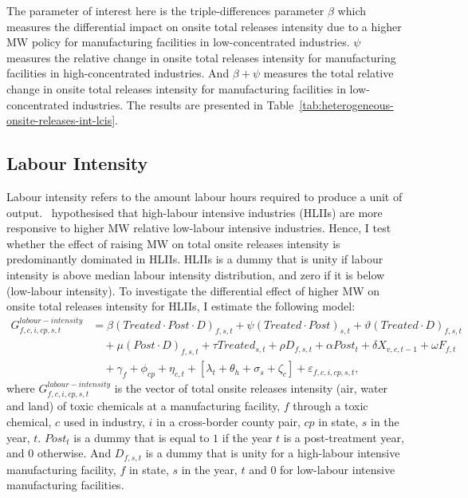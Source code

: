 \documentclass[12pt, english]{article}
\begin{document}
    The parameter of interest here is the triple-differences parameter $\beta$ which measures the differential impact on onsite total releases intensity due to a higher MW policy for manufacturing facilities in low-concentrated industries. $\psi$ measures the relative change in onsite total releases intensity for manufacturing facilities in high-concentrated industries. And $\beta + \psi$ measures the total relative change in onsite total releases intensity for manufacturing facilities in low-concentrated industries. The results are presented in Table~\ref{tab:heterogeneous-onsite-releases-int-lcis}.
    

    \subsection{Labour Intensity}\label{subsec:labour-intensity}
    Labour intensity refers to the amount labour hours required to produce a unit of output.~\cite{zhang2023unintended} hypothesised that high-labour intensive industries (HLIIs) are more responsive to higher MW relative low-labour intensive industries. Hence, I test whether the effect of raising MW on total onsite releases intensity is predominantly dominated in HLIIs. HLIIs is a dummy that is unity if labour intensity is above median labour intensity distribution, and zero if it is below (low-labour intensity). To investigate the differential effect of higher MW on onsite total releases intensity for HLIIs, I estimate the following model:
    \begin{align}
        G_{f,c,i,cp,s,t}^{labour-intensity} &= \beta (Treated \cdot Post \cdot D)_{f,s,t} + \psi (Treated \cdot Post)_{s,t} + \vartheta (Treated \cdot D)_{f,s,t} \nonumber \\
        &\quad + \mu (Post \cdot D)_{f,s,t} + \tau Treated_{s,t} + \rho D_{f,s,t} + \alpha Post_{t} + \delta X_{v,c,t-1} + \omega F_{f,t} \nonumber \\
        &\quad + \gamma_{f} + \phi_{cp} + \eta_{c,t} + \left[\lambda_{t} + \theta_{h} + \sigma_{s} + \zeta_{c} \right] + \varepsilon_{f,c,i,cp,s,t},\label{eq:heterogeneous-onsite-releases-intensity-liis}
    \end{align}
    where $G_{f,c,i,cp,s,t}^{labour-intensity}$ is the vector of total onsite releases intensity (air, water and land) of toxic chemicals at a manufacturing facility, $f$ through a toxic chemical, $c$ used in industry, $i$ in a cross-border county pair, $cp$ in state, $s$ in the year, $t$. $Post_{t}$ is a dummy that is equal to $1$ if the year $t$ is a post-treatment year, and $0$ otherwise. And $D_{f,s,t}$ is a dummy that is unity for a high-labour intensive manufacturing facility, $f$ in state, $s$ in the year, $t$ and $0$ for low-labour intensive manufacturing facilities.
    
\end{document}
